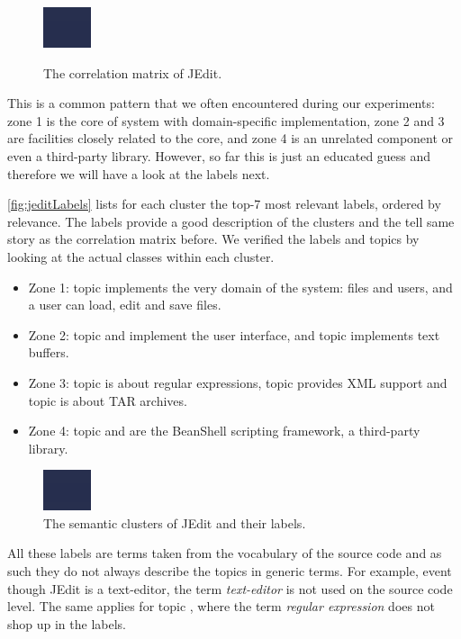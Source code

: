 \documentclass[10pt]{book}
\begin{document}
\begin{figure}[b]
  \centering
  \includegraphics{jeditcorrelationzone}\\
  \caption{The correlation matrix of JEdit.}\label{fig:jeditCorrelation}
\end{figure}

This is a common pattern that we often encountered during our experiments: zone 1 is the core of system with domain-specific implementation, zone 2 and 3 are facilities closely related to the core, and zone 4 is an unrelated component or even a third-party library. However, so far this is just an educated guess and therefore we will have a look at the labels next.

\autoref{fig:jeditLabels} lists for each cluster the top-7 most relevant labels, ordered by relevance. The labels provide a good description of the clusters and the tell same story as the correlation matrix before. We verified the labels and topics by looking at the actual classes within each cluster.

\begin{itemize}
  \item Zone 1: topic \red implements the very domain of the system: files and users, and a user can load, edit and save files.
  \item Zone 2: topic \green and \magenta implement the user interface, and topic \pink implements text buffers.
  \item Zone 3: topic \cyan is about regular expressions, topic \yellow provides XML support and topic \darkgreen is about TAR archives.
  \item Zone 4: topic \blue and \orange are the BeanShell scripting framework, a third-party library.
\end{itemize}

\begin{figure}[h]
\centering
\includegraphics{jeditCorrelationLabels}
\caption{The semantic clusters of JEdit and their labels.}\label{fig:jeditLabels}
\end{figure}

All these labels are terms taken from the vocabulary of the source code and as such they do not always describe the topics in generic terms. For example, event though JEdit is a text-editor, the term \emph{text-editor} is not used on the source code level. The same applies for topic \cyan, where the term \emph{regular expression} does not shop up in the labels.
\end{document}
